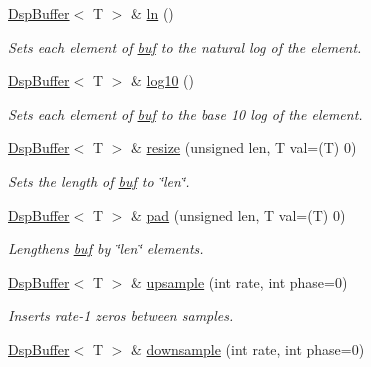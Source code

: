 \begin{DoxyCompactItemize}
\hyperlink{class_smart_dsp_1_1_dsp_buffer}{Dsp\+Buffer}$<$ T $>$ \& \hyperlink{class_smart_dsp_1_1_dsp_buffer_af9842cde9310511dafeb724d1b82d059}{ln} ()
\begin{DoxyCompactList}\small\item\em Sets each element of \hyperlink{class_smart_dsp_1_1_dsp_buffer_a7abb8184e08f4c9762f66bc75dcd3a6a}{buf} to the natural log of the element. \end{DoxyCompactList}\item 
\hyperlink{class_smart_dsp_1_1_dsp_buffer}{Dsp\+Buffer}$<$ T $>$ \& \hyperlink{class_smart_dsp_1_1_dsp_buffer_ac857bbed4305a0668c5e3960f681ba5d}{log10} ()
\begin{DoxyCompactList}\small\item\em Sets each element of \hyperlink{class_smart_dsp_1_1_dsp_buffer_a7abb8184e08f4c9762f66bc75dcd3a6a}{buf} to the base 10 log of the element. \end{DoxyCompactList}\item 
\hyperlink{class_smart_dsp_1_1_dsp_buffer}{Dsp\+Buffer}$<$ T $>$ \& \hyperlink{class_smart_dsp_1_1_dsp_buffer_af15c581be025d65b1e7934791d27b02e}{resize} (unsigned len, T val=(T) 0)
\begin{DoxyCompactList}\small\item\em Sets the length of \hyperlink{class_smart_dsp_1_1_dsp_buffer_a7abb8184e08f4c9762f66bc75dcd3a6a}{buf} to \char`\"{}len\char`\"{}. \end{DoxyCompactList}\item 
\hyperlink{class_smart_dsp_1_1_dsp_buffer}{Dsp\+Buffer}$<$ T $>$ \& \hyperlink{class_smart_dsp_1_1_dsp_buffer_ae1b10152d9fc0b8fb03bf2fb8d6bdbcd}{pad} (unsigned len, T val=(T) 0)
\begin{DoxyCompactList}\small\item\em Lengthens \hyperlink{class_smart_dsp_1_1_dsp_buffer_a7abb8184e08f4c9762f66bc75dcd3a6a}{buf} by \char`\"{}len\char`\"{} elements. \end{DoxyCompactList}\item 
\hyperlink{class_smart_dsp_1_1_dsp_buffer}{Dsp\+Buffer}$<$ T $>$ \& \hyperlink{class_smart_dsp_1_1_dsp_buffer_ae38a794c1f5e53b6e57b974751345296}{upsample} (int rate, int phase=0)
\begin{DoxyCompactList}\small\item\em Inserts rate-\/1 zeros between samples. \end{DoxyCompactList}\item 
\hyperlink{class_smart_dsp_1_1_dsp_buffer}{Dsp\+Buffer}$<$ T $>$ \& \hyperlink{class_smart_dsp_1_1_dsp_buffer_a75adf718fbcea9f3df132fbb0536ab61}{downsample} (int rate, int phase=0)

\end{DoxyCompactItemize}
